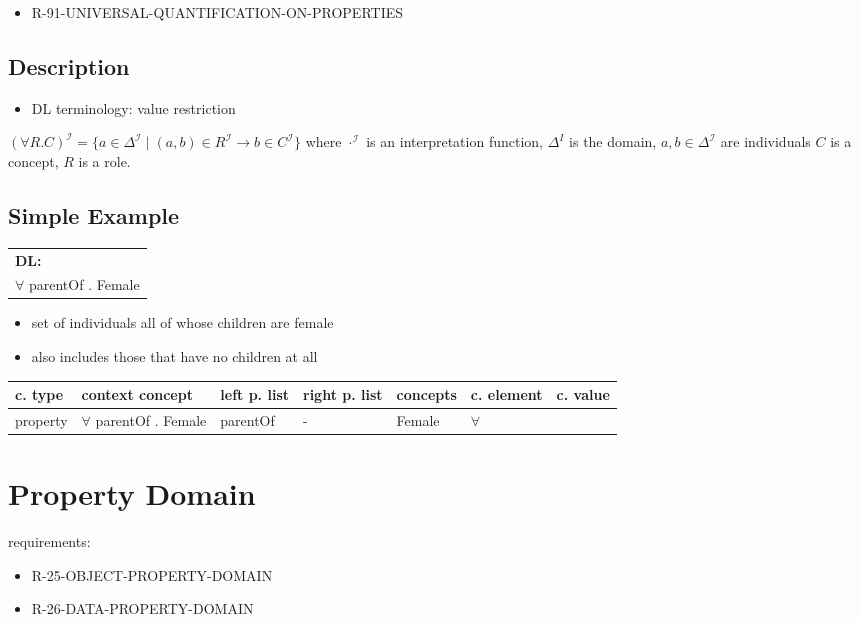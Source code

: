 \documentclass{llncs}
\newenvironment{gcotable}{
  \scriptsize
  \sffamily
  \vspace{0.3cm}
  \begin{tabular}{l|l|l|l|l|l|l}
  \hline
  \textbf{c. type} & \textbf{context concept} & \textbf{left p. list} & \textbf{right p. list} & \textbf{concepts} & \textbf{c. element} & \textbf{c. value} \\
  \hline

}{
  \hline
  \end{tabular}
  \linebreak
}
\newenvironment{DL}{
  \scriptsize
  \sffamily
  \vspace{0.3cm}
  \begin{tabular}{l}
	\textbf{DL:} \\

}{
  \end{tabular}
  \linebreak
}
\begin{document}
\begin{itemize}
	\item R-91-UNIVERSAL-QUANTIFICATION-ON-PROPERTIES
\end{itemize}

\subsection{Description}

\begin{itemize}
	\item DL terminology: value restriction
\end{itemize}


$(\forall R.C)^\mathcal{I}= \{a \in \Delta^\mathcal{I}\mid (a,b) \in R^\mathcal{I} \rightarrow b \in C^\mathcal{I} \}$ where $\cdot^\mathcal{I}$ is an interpretation function, $\Delta^I$ is the domain, $a,b \in \Delta^\mathcal{I}$ are individuals $C$ is a concept, $R$ is a role. 

\subsection{Simple Example}

\begin{DL}
$\forall$ parentOf . Female
\end{DL}

\begin{itemize}
	\item set of individuals all of whose children are female
  \item also includes those that have no children at all
\end{itemize}

\begin{gcotable}
property & $\forall$ parentOf . Female & parentOf & - & Female & $\forall$ \\
\end{gcotable}

\section{Property Domain}

requirements:

\begin{itemize}
	\item R-25-OBJECT-PROPERTY-DOMAIN
	\item R-26-DATA-PROPERTY-DOMAIN
\end{itemize}
\end{document}

